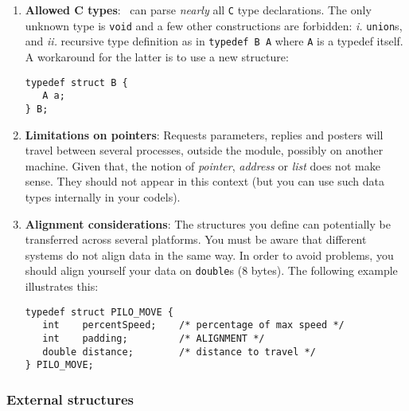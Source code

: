 \begin{enumerate}
\item \textbf{Allowed C types}: \GenoM\ can parse \emph{nearly} all \texttt{C}
type declarations. The  only unknown type  is \texttt{void}  and a few other
constructions are  forbidden:  \emph{i.}   \texttt{union}s,  and  \emph{ii.}
recursive type definition as   in \texttt{typedef B A}   where \texttt{A}  is a
typedef itself. A workaround for the latter is to use a new structure:

\begin{center}\begin{cartouche}\small\begin{verbatim}
typedef struct B {
   A a;
} B;
\end{verbatim}\end{cartouche}\end{center}

\item \textbf{Limitations on pointers}: Requests parameters, replies and
posters  will  travel  between  several  processes,  outside  the module,
possibly on  another machine.  Given that,  the  notion of \emph{pointer},
\emph{address} or \emph{list} does not make  sense.  They should not appear
in this context (but  you  can use  such data  types internally in   your
codels).

\item \textbf{Alignment considerations}: The structures you define can
potentially be transferred across several  platforms.  You must be  aware
that different systems do not  align data in   the same way. In order  to
avoid problems, you should  align yourself your data  on \texttt{double}s (8
bytes). The following example illustrates this:

\begin{center}\begin{cartouche}\small\begin{verbatim}
typedef struct PILO_MOVE {
   int    percentSpeed;    /* percentage of max speed */
   int    padding;         /* ALIGNMENT */
   double distance;        /* distance to travel */
} PILO_MOVE;
\end{verbatim}\end{cartouche}\end{center}

\end{enumerate}


\subsubsection{External structures}

